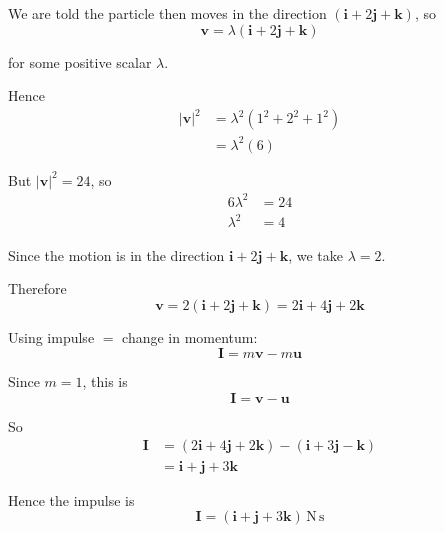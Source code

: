 \documentclass[leqno]{article}
\begin{document}
\begin{enumerate}[
  label=\textbf{\arabic*.},
  leftmargin=*,
  topsep=0pt,
  partopsep=0pt,
  parsep=0pt
]
\begin{djsSolution}
We are told the particle then moves in the direction \((\mathbf{i}+2\mathbf{j}+\mathbf{k})\), so
\[
\mathbf{v}=\lambda(\mathbf{i}+2\mathbf{j}+\mathbf{k})
\]

for some positive scalar \(\lambda\).

Hence
\begin{align*}
|\mathbf{v}|^2&=\lambda^2(1^2+2^2+1^2)\\
&=\lambda^2(6)
\end{align*}

But \( |\mathbf{v}|^2=24\), so
\begin{align*}
6\lambda^2&=24\\
\lambda^2&=4
\end{align*}

Since the motion is in the direction \(\mathbf{i}+2\mathbf{j}+\mathbf{k}\), we take \(\lambda=2\).

Therefore
\[
\mathbf{v}=2(\mathbf{i}+2\mathbf{j}+\mathbf{k})=2\mathbf{i}+4\mathbf{j}+2\mathbf{k}
\]

Using impulse \(=\) change in momentum:
\[
\mathbf{I}=m\mathbf{v}-m\mathbf{u}
\]

Since \(m=1\), this is
\[
\mathbf{I}=\mathbf{v}-\mathbf{u}
\]

So
\begin{align*}
\mathbf{I}&=(2\mathbf{i}+4\mathbf{j}+2\mathbf{k})-(\mathbf{i}+3\mathbf{j}-\mathbf{k})\\
&=\mathbf{i}+\mathbf{j}+3\mathbf{k}
\end{align*}

Hence the impulse is
\[
\mathbf{I}=(\mathbf{i}+\mathbf{j}+3\mathbf{k})\,\mathrm{N\,s}
\]
\end{djsSolution}


\end{enumerate}
\end{document}
